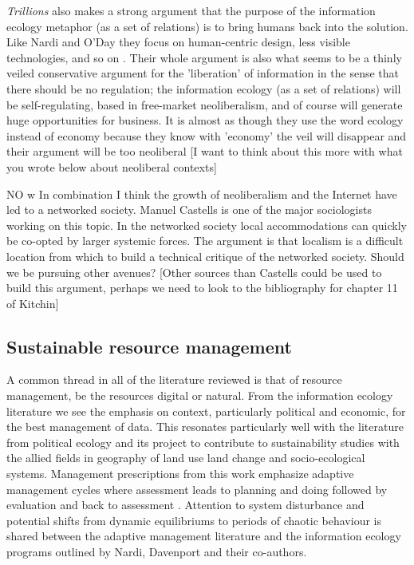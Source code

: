 \textit{Trillions} also makes a strong argument that the purpose of the information ecology metaphor (as a set of relations) is to bring humans back into the solution. Like Nardi and O'Day they focus on human-centric design, less visible technologies, and so on \citep{lucas_2012}. Their whole argument is also what seems to be a thinly veiled conservative argument for the 'liberation' of information in the sense that there should be no regulation; the information ecology (as a set of relations) will be self-regulating, based in free-market neoliberalism, and of course will generate huge opportunities for business. It is almost as though they use the word ecology instead of economy because they know with 'economy' the veil will disappear and their argument will be too neoliberal [I want to think about this more with what you wrote below about neoliberal contexts]

NO w In combination I think the growth of neoliberalism and the Internet have led to a networked society. Manuel Castells is one of the major sociologists working on this topic. In the networked society local accommodations can quickly be co-opted by larger systemic forces. The argument is that localism is a difficult location from which to build a technical critique of the networked society. Should we be pursuing other avenues? [Other sources than Castells could be used to build this argument, perhaps we need to look to the bibliography for chapter 11 of Kitchin]

\subsection{Sustainable resource management}

A common thread in all of the literature reviewed is that of resource management, be the resources digital or natural. From the information ecology literature we see the emphasis on context, particularly political and economic, for the best management of data. This resonates particularly well with the literature from political ecology and its project to contribute to sustainability studies with the allied fields in geography of land use land change and socio-ecological systems. Management prescriptions from this work emphasize adaptive management cycles where assessment leads to planning and doing followed by evaluation and back to assessment \citep{holling_1978,liu_etal_2007}. Attention to system disturbance and potential shifts from dynamic equilibriums to periods of chaotic behaviour is shared between the adaptive management literature and the information ecology programs outlined by Nardi, Davenport and their co-authors. 

